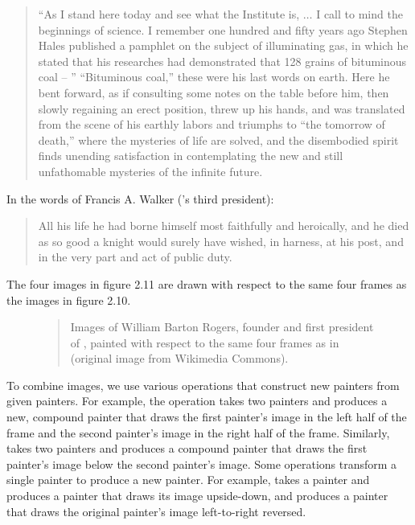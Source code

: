 {\begin{quote}
``As I stand here today and see what the Institute is, \( \dots \) I call to mind
the beginnings of science.  I remember one hundred and fifty years ago Stephen
Hales published a pamphlet on the subject of illuminating gas, in which he
stated that his researches had demonstrated that 128 grains of bituminous coal
-- '' ``Bituminous coal,'' these were his last words on earth.  Here he bent
forward, as if consulting some notes on the table before him, then slowly
regaining an erect position, threw up his hands, and was translated from the
scene of his earthly labors and triumphs to ``the tomorrow of death,'' where
the mysteries of life are solved, and the disembodied spirit finds unending
satisfaction in contemplating the new and still unfathomable mysteries of the
infinite future.
\end{quote}

In the words of Francis A. Walker ('s third president):

\begin{quote}
All his life he had borne himself most faithfully and heroically, and he died
as so good a knight would surely have wished, in harness, at his post, and in
the very part and act of public duty.
\end{quote}
} The four images in figure 2.11 are drawn with respect to the same four
frames as the  images in figure 2.10.

\begin{figure}[tb]
\label{Figure 2.11}
\centering

\begin{quote}
 Images of William Barton Rogers, founder and first president of , painted with respect to the same four frames as in  (original image from Wikimedia Commons).
\end{quote}
\end{figure}

To combine images, we use various operations that construct new painters from
given painters.  For example, the  operation takes two painters
and produces a new, compound painter that draws the first painter's image in
the left half of the frame and the second painter's image in the right half of
the frame.  Similarly,  takes two painters and produces a compound
painter that draws the first painter's image below the second painter's image.
Some operations transform a single painter to produce a new painter.  For
example,  takes a painter and produces a painter that draws its
image upside-down, and  produces a painter that draws the
original painter's image left-to-right reversed.

